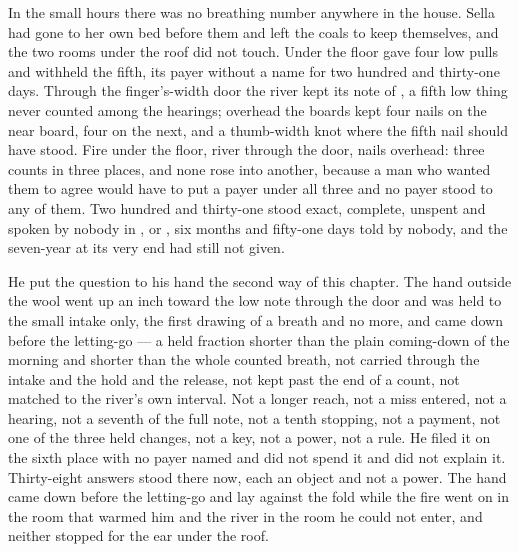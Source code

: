 \scenebreak

In the small hours there was no breathing number anywhere in the house. Sella had gone to her own bed before them and left the coals to keep themselves, and the two rooms under the roof did not touch. Under the floor  gave four low pulls and withheld the fifth, its payer without a name for two hundred and thirty-one days. Through the finger's-width door the river kept its note of , a fifth low thing never counted among the hearings; overhead the boards kept four nails on the near board, four on the next, and a thumb-width knot where the fifth nail should have stood. Fire under the floor, river through the door, nails overhead: three counts in three places, and none rose into another, because a man who wanted them to agree would have to put a payer under all three and no payer stood to any of them. Two hundred and thirty-one stood exact, complete, unspent and spoken by nobody in ,  or , six months and fifty-one days told by nobody, and the seven-year at its very end had still not given.

He put the question to his hand the second way of this chapter. The hand outside the wool went up an inch toward the low note through the door and was held to the small intake only, the first drawing of a breath and no more, and came down before the letting-go --- a held fraction shorter than the plain coming-down of the morning and shorter than the whole counted breath, not carried through the intake and the hold and the release, not kept past the end of a count, not matched to the river's own interval. Not a longer reach, not a miss entered, not a hearing, not a seventh of the full note, not a tenth stopping, not a payment, not one of the three held changes, not a key, not a power, not a rule. He filed it on the sixth place with no payer named and did not spend it and did not explain it. Thirty-eight answers stood there now, each an object and not a power. The hand came down before the letting-go and lay against the fold while the fire went on in the room that warmed him and the river in the room he could not enter, and neither stopped for the ear under the roof.

